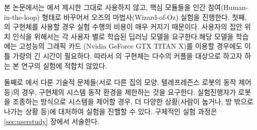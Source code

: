 
본 논문에서는 \cite{kang2018homemeld}에서 제시한 \sysname\을 그대로 사용하지 않고, 핵심 모듈들을 인간 참여(Human-in-the-loop) 형태로 바꾸어서 오즈의 마법사(Wizard-of-Oz) 실험을 진행한다. 첫째, \cite{kang2018homemeld}의 구현체를 사용할 경우 실험 수행의 비용이 매우 커지기 때문이다. 사용자의  집안 위치 인식을 위해서는 각 사용자 별로 학습된 딥러닝 모델을 요구한다.해당 모델을 학습에는 고성능의 그래픽 카드 (Nvidia GeForce GTX TITAN X)를 이용할 경우에도 이틀 가량의 긴 시간이 필요하다. 따라서 \cite{kang2018homemeld}의 구현체는 다수의 커플을 대상으로 하고자 하는 본 연구의 실험에 적합치 않았다. 

둘째로 \cite{kang2018homemeld}에서 다룬 기술적 문제들(서로 다른 집의 모양, 텔레프레즌스 로봇의 동작 제어 등)의 경우, 구현체의 시스템 동작 환경을 제한하는 것을 요구한다. 실험진행자가 로봇을 조종하는 방식으로 시스템을 제어할 경우, 더 다양한 상황(사람이 눕거나, 방 밖으로 나가는 상황 등)에 대처하여 실험을 진핼할 수 있다. 구체적인 실험 과정은 \ref{sec:userstudy} 장에서 서술한다.

